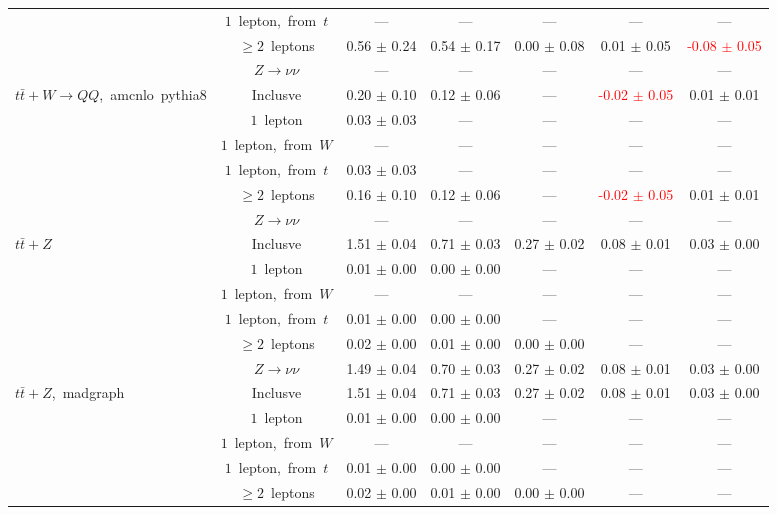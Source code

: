 \documentclass{article}
\begin{document}
\begin{longtable}{|l|c|c|c|c|c|c|}
 & $1$~lepton,~from~$t$  & ---  & ---  & ---  & ---  & --- \\* 
 & $\ge2$~leptons  & 0.56 $\pm$ 0.24  & 0.54 $\pm$ 0.17  & 0.00 $\pm$ 0.08  & 0.01 $\pm$ 0.05  & \textcolor{red}{ -0.08 $\pm$ 0.05 } \\* 
 & $Z\rightarrow\nu\nu$  & ---  & ---  & ---  & ---  & --- \\* 
\hline 
\multirow{6}{*}{$t\bar{t}+W{\rightarrow}QQ$,~amcnlo~pythia8} & Inclusve  & 0.20 $\pm$ 0.10  & 0.12 $\pm$ 0.06  & ---  & \textcolor{red}{ -0.02 $\pm$ 0.05 }  & 0.01 $\pm$ 0.01 \\* 
 & $1$~lepton  & 0.03 $\pm$ 0.03  & ---  & ---  & ---  & --- \\* 
 & $1$~lepton,~from~$W$  & ---  & ---  & ---  & ---  & --- \\* 
 & $1$~lepton,~from~$t$  & 0.03 $\pm$ 0.03  & ---  & ---  & ---  & --- \\* 
 & $\ge2$~leptons  & 0.16 $\pm$ 0.10  & 0.12 $\pm$ 0.06  & ---  & \textcolor{red}{ -0.02 $\pm$ 0.05 }  & 0.01 $\pm$ 0.01 \\* 
 & $Z\rightarrow\nu\nu$  & ---  & ---  & ---  & ---  & --- \\* 
\hline 
\multirow{6}{*}{$t\bar{t}+Z$} & Inclusve  & 1.51 $\pm$ 0.04  & 0.71 $\pm$ 0.03  & 0.27 $\pm$ 0.02  & 0.08 $\pm$ 0.01  & 0.03 $\pm$ 0.00 \\* 
 & $1$~lepton  & 0.01 $\pm$ 0.00  & 0.00 $\pm$ 0.00  & ---  & ---  & --- \\* 
 & $1$~lepton,~from~$W$  & ---  & ---  & ---  & ---  & --- \\* 
 & $1$~lepton,~from~$t$  & 0.01 $\pm$ 0.00  & 0.00 $\pm$ 0.00  & ---  & ---  & --- \\* 
 & $\ge2$~leptons  & 0.02 $\pm$ 0.00  & 0.01 $\pm$ 0.00  & 0.00 $\pm$ 0.00  & ---  & --- \\* 
 & $Z\rightarrow\nu\nu$  & 1.49 $\pm$ 0.04  & 0.70 $\pm$ 0.03  & 0.27 $\pm$ 0.02  & 0.08 $\pm$ 0.01  & 0.03 $\pm$ 0.00 \\* 
\hline 
\multirow{6}{*}{$t\bar{t}+Z$,~madgraph} & Inclusve  & 1.51 $\pm$ 0.04  & 0.71 $\pm$ 0.03  & 0.27 $\pm$ 0.02  & 0.08 $\pm$ 0.01  & 0.03 $\pm$ 0.00 \\* 
 & $1$~lepton  & 0.01 $\pm$ 0.00  & 0.00 $\pm$ 0.00  & ---  & ---  & --- \\* 
 & $1$~lepton,~from~$W$  & ---  & ---  & ---  & ---  & --- \\* 
 & $1$~lepton,~from~$t$  & 0.01 $\pm$ 0.00  & 0.00 $\pm$ 0.00  & ---  & ---  & --- \\* 
 & $\ge2$~leptons  & 0.02 $\pm$ 0.00  & 0.01 $\pm$ 0.00  & 0.00 $\pm$ 0.00  & ---  & --- \\* 

\end{longtable}
\end{document}
